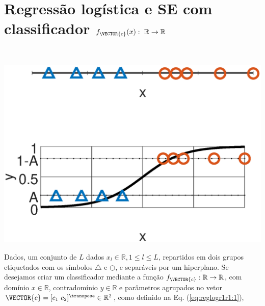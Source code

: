 \newpage

\section{Regressão logística e SE com classificador $f_{\VECTOR{c}}(x):~\mathbb{R} \rightarrow \mathbb{R}$}
\label{sec:theo:reglogr1r1:1}




\begin{theorem}\label{theo:reglogr1r1:1}
~\\
\noindent
\begin{minipage}{0.45\textwidth}
\centering
\includegraphics[width=0.95\linewidth]{chapters/classificacao/mfiles/reglogr1r1/reglogr1r1.eps} 
\end{minipage}
\begin{minipage}{0.55\textwidth}
Dados, um conjunto de $L$ dados $x_l \in \mathbb{R}, 1 \leq l \leq L$,
repartidos em dois grupos etiquetados com os símbolos $\bigtriangleup$ e $\bigcirc$, 
e separáveis por um hiperplano.
Se desejamos criar um classificador mediante 
a função  $f_{\VECTOR{c}}:\mathbb{R} \rightarrow \mathbb{R}$,
com domínio $x \in \mathbb{R}$, contradomínio $y \in \mathbb{R}$ e 
parâmetros agrupados no vetor $\VECTOR{c}=[c_1~ c_2]^{\transpose}\in \mathbb{R}^{2}$,
como definido na Eq. (\ref{eq:reglogr1r1:1}),

\end{minipage}
\end{theorem}
